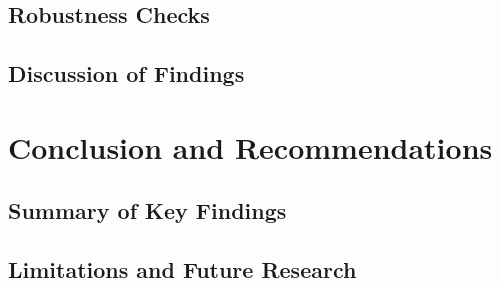 \documentclass[Department of Economics]{AEA}
\begin{document}
\par\endgroup

\subsection{Robustness Checks}\label{robustness-checks}

\subsection{Discussion of Findings}\label{discussion-of-findings}

\section{Conclusion and
Recommendations}\label{conclusion-and-recommendations}

\subsection{Summary of Key Findings}\label{summary-of-key-findings}

\subsection{Limitations and Future
Research}\label{limitations-and-future-research}
\end{document}
